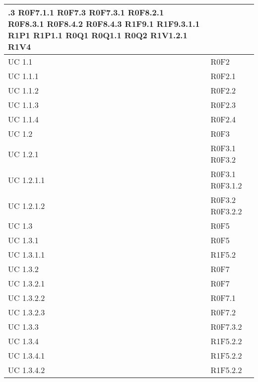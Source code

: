 \begin{center}
\begin{longtable}{| p{4cm} | p{4cm} |}
.3 \newline R0F7.1.1 \newline R0F7.3 \newline R0F7.3.1 \newline R0F8.2.1 \newline R0F8.3.1 \newline R0F8.4.2 \newline R0F8.4.3 \newline R1F9.1 \newline R1F9.3.1.1 \newline R1P1 \newline R1P1.1 \newline R0Q1 \newline R0Q1.1 \newline R0Q2 \newline R1V1.2.1 \newline R1V4 \\
		\hline
		UC 1.1  &  R0F2 \\
		\hline
		UC 1.1.1  &  R0F2.1 \\
		\hline
		UC 1.1.2  &  R0F2.2 \\
		\hline
		UC 1.1.3  &  R0F2.3 \\
		\hline
		UC 1.1.4  &  R0F2.4 \\
		\hline
		UC 1.2  &  R0F3 \\
		\hline
		UC 1.2.1  &  R0F3.1 \newline R0F3.2 \\
		\hline
		UC 1.2.1.1  &  R0F3.1 \newline R0F3.1.2 \\
		\hline
		UC 1.2.1.2  &  R0F3.2 \newline R0F3.2.2 \\
		\hline
		UC 1.3  &  R0F5 \\
		\hline
		UC 1.3.1  &  R0F5 \\
		\hline
		UC 1.3.1.1  &  R1F5.2 \\
		\hline
		UC 1.3.2  &  R0F7 \\
		\hline
		UC 1.3.2.1  &  R0F7 \\
		\hline
		UC 1.3.2.2  &  R0F7.1 \\
		\hline
		UC 1.3.2.3  &  R0F7.2 \\
		\hline
		UC 1.3.3  &  R0F7.3.2 \\
		\hline
		UC 1.3.4  &  R1F5.2.2 \\
		\hline
		UC 1.3.4.1  &  R1F5.2.2 \\
		\hline
		UC 1.3.4.2  &  R1F5.2.2 \\

\end{longtable}
\end{center}
